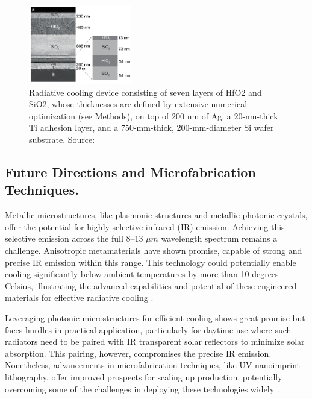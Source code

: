 \begin{figure}[ht!]
  \centering
  \includegraphics[width=0.4\textwidth]{Chapters/Figures/Chapter 1 Figures/Planar Photonic Devices.jpg}
  \caption{Radiative cooling device consisting of seven layers of HfO2 and SiO2, whose thicknesses are defined by extensive numerical optimization (see Methods), on top of 200 nm of Ag, a 20-nm-thick Ti adhesion layer, and a 750-mm-thick, 200-mm-diameter Si wafer substrate. Source: \cite{raman_passive_2014}}
  \label{fig:planar_photonic_device}
\end{figure}

\subsection{Future Directions and Microfabrication Techniques.}
Metallic microstructures, like plasmonic structures and metallic photonic crystals, offer the potential for highly selective infrared (IR) emission. Achieving this selective emission across the full 8–13 $\mu m$ wavelength spectrum remains a challenge. Anisotropic metamaterials have shown promise, capable of strong and precise IR emission within this range. This technology could potentially enable cooling significantly below ambient temperatures by more than 10 degrees Celsius, illustrating the advanced capabilities and potential of these engineered materials for effective radiative cooling \cite{hossain_radiative_2016}.

Leveraging photonic microstructures for efficient cooling shows great promise but faces hurdles in practical application, particularly for daytime use where such radiators need to be paired with IR transparent solar reflectors to minimize solar absorption. This pairing, however, compromises the precise IR emission. Nonetheless, advancements in microfabrication techniques, like UV-nanoimprint lithography, offer improved prospects for scaling up production, potentially overcoming some of the challenges in deploying these technologies widely \cite{hossain_radiative_2016}.


